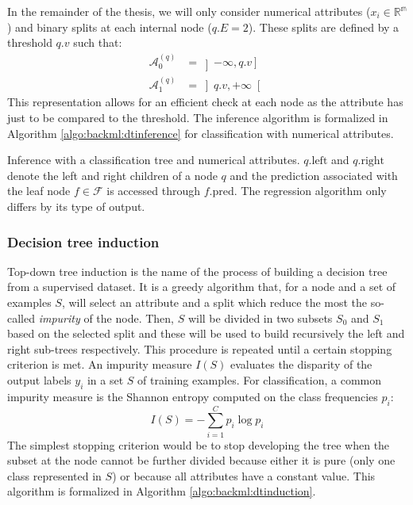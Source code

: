In the remainder of the thesis, we will only consider numerical attributes ($x_i \in \mathbb{R^m}$) and
binary splits at each internal node ($q.E = 2$). These splits are defined by a
threshold $q.v$ such that:
\begin{align}
\label{eqn:backml:dt:splitsbinary}
\mathcal{A}^{(q)}_0 &= \left]-\infty, q.v\right]\\
\mathcal{A}^{(q)}_1 &= \left]q.v, +\infty\right[
\end{align}
This representation allows for an efficient check at each node as the attribute
has just to be compared to the threshold. The inference algorithm is formalized in
Algorithm \ref{algo:backml:dtinference} for classification with numerical
attributes.

\begin{algorithm}[t]
  \SetAlgoLined
  \caption{Inference with a classification tree and numerical attributes. $q.\text{left}$ and $q.\text{right}$ denote the left and right children of a node $q$ and the prediction associated with the leaf node $f \in \mathcal{F}$ is accessed through $f.\text{pred}$. The regression algorithm only differs by its type of output.}
  \label{algo:backml:dtinference}
\end{algorithm}

\subsubsection{Decision tree induction}
\label{sssec:backml:dtinduction}

Top-down tree induction is the name of the process of building a decision tree
from a supervised dataset. It is a greedy algorithm that, for a node and a set of
examples $S$, will select an attribute and a split which reduce the most the
so-called \textit{impurity} of the node. Then, $S$ will be divided in two subsets
$S_0$ and $S_1$ based on the selected split and these will be used to build
recursively the left and right sub-trees respectively. This procedure is repeated
until a certain stopping criterion is met. An impurity measure $I(S)$ evaluates
the disparity of the output labels $y_i$ in a set $S$ of training examples. For
classification, a common impurity measure is the Shannon entropy computed on the
class frequencies $p_i$:
\begin{equation}
\label{eqn:backml:shannon_entropy}
I(S) = - \sum_{i=1}^C p_i \log p_i
\end{equation}
The simplest stopping criterion would be to stop developing the tree when the
subset at the node cannot be further divided because either it is pure (\eg only
one class represented in $S$) or because all attributes have a constant value.
This algorithm is formalized in Algorithm \ref{algo:backml:dtinduction}.


